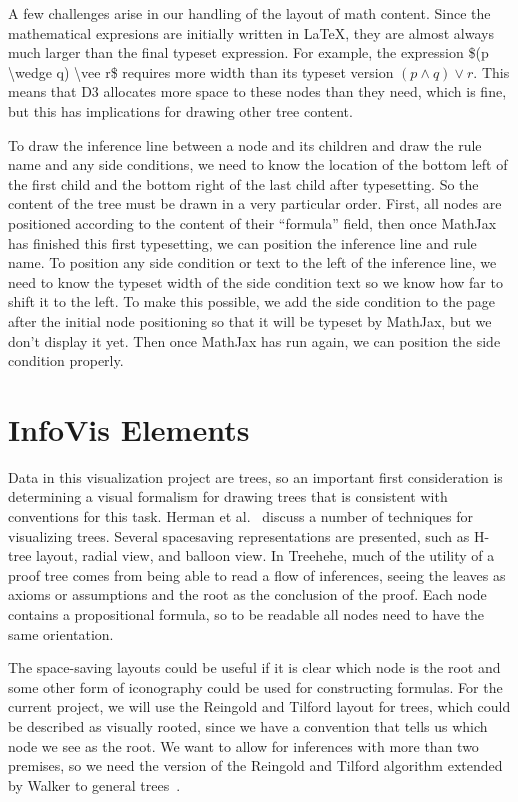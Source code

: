 \documentclass[conference]{IEEEtran}
\newcommand{\projectname}{Treehehe}
\begin{document}
A few challenges arise in our handling of the layout of math content. Since the mathematical expresions are initially written in \LaTeX{}, they are almost always much larger than the final typeset expression. For example, the expression \$(p \textbackslash wedge q) \textbackslash vee r\$ requires more width than its typeset version $(p \wedge q) \vee r$. This means that D3 allocates more space to these nodes than they need, which is fine, but this has implications for drawing other tree content.

To draw the inference line between a node and its children and draw the rule name and any side conditions, we need to know the location of the bottom left of the first child and the bottom right of the last child after typesetting. So the content of the tree must be drawn in a very particular order. First, all nodes are positioned according to the content of their ``formula'' field, then once MathJax has finished this first typesetting, we can position the inference line and rule name. To position any side condition or text to the left of the inference line, we need to know the typeset width of the side condition text so we know how far to shift it to the left. To make this possible, we add the side condition to the page after the initial node positioning so that it will be typeset by MathJax, but we don't display it yet. Then once MathJax has run again, we can position the side condition properly.


\section{InfoVis Elements}
\label{sec:infoviselem}

Data in this visualization project are trees, so an important first consideration is determining a visual formalism for drawing trees that is consistent with conventions for this task. Herman et al.~\cite{graphvis-herman+melancon+marshall} discuss a number of techniques for visualizing trees. Several spacesaving representations are presented, such as H-tree layout, radial view, and balloon view. In \projectname{}, much of the utility of a proof tree comes from being able to read a flow of inferences, seeing the leaves as axioms or assumptions and the root as the conclusion of the proof. Each node contains a propositional formula, so to be readable all nodes need to have the same orientation.

The space-saving layouts could be useful if it is clear which node is the root and some other form of iconography could be used for constructing formulas. For the current project, we will use the Reingold and Tilford layout for trees, which could be described as visually rooted, since we have a convention that tells us which node we see as the root. We want to allow for inferences with more than two premises, so we need the version of the Reingold and Tilford algorithm extended by Walker to general trees~\cite{generaltreeslayout-walker}.
\end{document}
